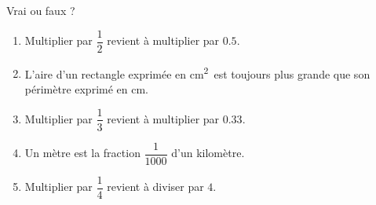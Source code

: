 
\begin{exercice}\label{exosmath-0879}

    Vrai ou faux ?
    \begin{enumerate}
        \item
            Multiplier par \( \dfrac{ 1 }{ 2 }\) revient à multiplier par \( 0.5\).
        \item
            L'aire d'un rectangle exprimée en \si{\centi\meter\squared}\ est toujours plus grande que son périmètre exprimé en \si{\centi\meter}.
        \item
            Multiplier par \( \dfrac{ 1 }{ 3 }\) revient à multiplier par \( 0.33\).
        \item
            Un mètre est la fraction \( \dfrac{ 1 }{ 1000 }\) d'un kilomètre.
        \item
            Multiplier par \( \dfrac{ 1 }{ 4 }\) revient à diviser par \( 4 \).
    \end{enumerate}

\end{exercice}
